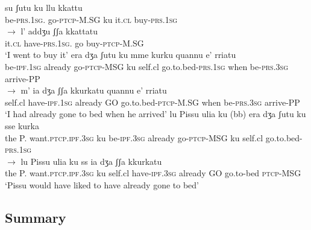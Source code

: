 \documentclass[output=paper]{langscibook}
\begin{document}
\ea\label{ac47}
    \ea \label{ac47a}
        \ea \label{ac47ai}\gll su        ʃutu        ku  llu   kkattu\\
       be-\textsc{prs}.\textsc{1sg}.    go-\textsc{ptcp}-M.SG  ku   it.\textsc{cl} buy-\textsc{prs}.\textsc{1sg}\\
        \ex \label{ac47aii}$\rightarrow$ \gll l’   addʒu       ʃʃa   kkattatu\\
       it.\textsc{cl} have-\textsc{prs}.\textsc{1sg}.    go  buy-\textsc{ptcp}-M.SG\\
      \glt ‘I went to buy it’
        \z
    \ex\label{ac47b}
        \ea \label{ac47bi}\gll era      dʒa    ʃutu      ku mme   kurku     quannu  e’       rriatu \\
       be-\textsc{ipf}.\textsc{1sg} already go-\textsc{ptcp}-MSG ku self.cl go.to.bed-\textsc{prs}.\textsc{1sg}
       when    be-\textsc{prs}.\textsc{3sg}  arrive-PP\\
        \ex    \label{ac47bii}$\rightarrow$  \gll m’   ia        dʒa   ʃʃa  kkurkatu        quannu  e’        rriatu\\
       self.cl  have-\textsc{ipf}.\textsc{1sg} already GO  go.to.bed-\textsc{ptcp}-M.SG
       when    be-\textsc{prs}.\textsc{3sg}  arrive-PP\\
       \glt ‘I had already gone to bed when he arrived’
        \z
    \ex\label{ac47c}
        \ea \label{ac47ci}\gll lu Pissu ulia   {ku    (bb)} era    dʒa   ʃutu         ku sse    kurka\\
       the P.  want.\textsc{ptcp.ipf.3sg} ku be-\textsc{ipf}.\textsc{3sg} already go-\textsc{ptcp}-MSG    ku self.cl   go.to.bed-\textsc{prs}.\textsc{1sg}\\
        \ex  \label{ac47cii}  $\rightarrow$ \gll lu Pissu ulia   ku       ss   ia      dʒa         ʃʃa  kkurkatu\\
      the P.  want.\textsc{ptcp.ipf.3sg} ku self.cl  have-\textsc{ipf}.\textsc{3sg} already
       GO go.to-bed \textsc{ptcp}-MSG\\
      \glt ‘Pissu would have liked to have already gone to bed’
        \z
    \z
\z

\subsection{Summary}
\end{document}
